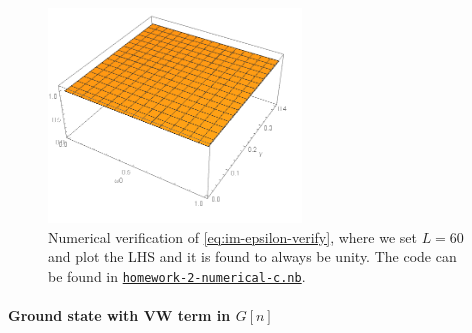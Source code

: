 \documentclass[hyperref, a4paper]{article}
\begin{document}
\begin{figure}
    \centering
    \includegraphics[width=0.6\textwidth]{sum-rule-im-epsilon.PNG}
    \caption{Numerical verification of \eqref{eq:im-epsilon-verify}, where we set $L=60$ and plot the LHS and it is found to always be unity. The code can be found in \href{./homework-2-numerical-c.nb}{\texttt{homework-2-numerical-c.nb}}.}
    \label{fig:im-epsilon-plot}
\end{figure}

\paragraph{}

\paragraph{Ground state with VW term in $G[n]$} 
\end{document}
